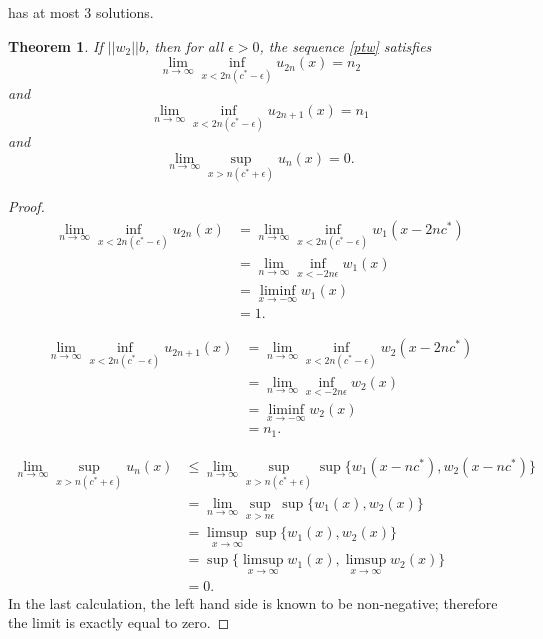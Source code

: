 \documentclass[11pt]{article}
\newtheorem{thm}{Theorem}
\theoremstyle{definition}
\numberwithin{equation}{section}
\numberwithin{thm}{section}
\renewcommand{\b}{b}
\newcommand{\m}{n_1}
\newcommand{\mtwo}{n_2}
\begin{document}
has at most 3 solutions.

\begin{thm}  \label{theorem2}
If $||w_2|| \b$, then for all $\epsilon>0$, the sequence \ref{ptw} satisfies
\begin{equation}
\lim_{n\to\infty}\inf_{x<2n(c^*-\epsilon)}u_{2n}(x)=\mtwo
\end{equation}
and
\begin{equation}
\lim_{n\to\infty}\inf_{x<2n(c^*-\epsilon)}u_{2n+1}(x)=\m
\end{equation}
and 
\begin{equation}
\lim_{n\to\infty}\sup_{x>n(c^*+\epsilon)}u_n(x)=0.
\end{equation}
\end{thm}

\begin{proof}
\begin{equation} \begin{aligned}
\lim_{n\to\infty}\inf_{x<2n(c^*-\epsilon)}u_{2n}(x)
&= \lim_{n\to\infty}\inf_{x<2n(c^*-\epsilon)}w_1(x-2nc^*) \\
&= \lim_{n\to\infty}\inf_{x<-2n\epsilon}w_1(x) \\
&= \liminf_{x\to-\infty}w_1(x) \\ &= 1.
\end{aligned} \end{equation}

\begin{equation} \begin{aligned}
\lim_{n\to\infty}\inf_{x<2n(c^*-\epsilon)}u_{2n+1}(x)
&= \lim_{n\to\infty}\inf_{x<2n(c^*-\epsilon)}w_2(x-2nc^*) \\
&= \lim_{n\to\infty}\inf_{x<-2n\epsilon}w_2(x) \\
&= \liminf_{x\to-\infty}w_2(x) \\ &= \m.
\end{aligned} \end{equation}

\begin{equation} \begin{aligned}
\lim_{n\to\infty} \sup_{x>n(c^*+\epsilon)} u_n(x) 
&\leq \lim_{n\to\infty} \sup_{x>n(c^*+\epsilon)} \sup\{w_1(x-nc^*),w_2(x-nc^*)\} \\
&= \lim_{n\to\infty} \sup_{x>n\epsilon} \sup\{w_1(x),w_2(x)\} \\
&= \limsup_{x\to\infty} \sup\{w_1(x),w_2(x)\} \\ 
&= \sup\{\limsup_{x\to\infty} w_1(x),\limsup_{x\to\infty} w_2(x)\} \\
&= 0.
\end{aligned} \end{equation}
In the last calculation, the left hand side is known to be non-negative; therefore the limit is exactly equal to zero.
\end{proof}
\end{document}
